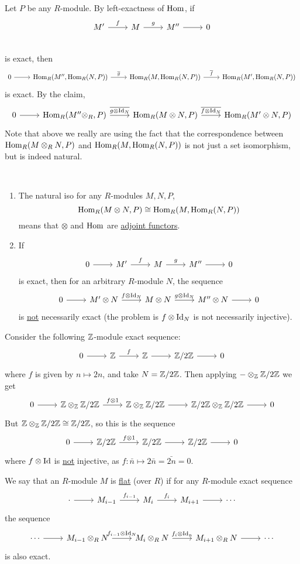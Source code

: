 \documentclass[x11names,reqno,14pt]{extarticle}
\begin{document}
Let $P$ be any $R$-module. By left-exactness of ${\mathrm{Hom}}$, if 
\[
\begin{tikzcd}
M'\ar[r, "f"] & M \ar[r, "g"] & M'' \ar[r] & 0 \\
\end{tikzcd}
\]
is exact, then 
\[
\begin{tikzcd}
0\ar[r] & \Hom_R(M'', \Hom_R(N, P)) \ar[r, "\bar{g}"] & \Hom_R(M, \Hom_R(N, P)) \ar[r, "\bar{f}"] & \Hom_R(M', \Hom_R(N, P))
\end{tikzcd}
\]
is exact. By the claim, 
\[
\begin{tikzcd}
0\ar[r]&\Hom_R(M''\otimes_R, P) \ar[r, "\bar{g\otimes\Id_N}"] & \Hom_R(M\otimes N, P) \ar[r, "\bar{f\otimes\Id_N}"] &\Hom_R(M'\otimes N, P)
\end{tikzcd}
\]
Note that above we really are using the fact that the correspondence between ${\mathrm{Hom}}_R(M\otimes_RN, P)$ and ${\mathrm{Hom}}_R(M, {\mathrm{Hom}}_R(N, P))$ is not just a set isomorphism, but is indeed natural.

\rem\,

\begin{enumerate}

\item The natural iso for any $R$-modules $M, N, P$, 
\[
{\mathrm{Hom}}_R(M\otimes N, P) \cong {\mathrm{Hom}}_R(M,{\mathrm{Hom}}_R(N, P))
\]
means that $\otimes$ and ${\mathrm{Hom}}$ are \underline{adjoint functors}.

\item If 
\[
\exactshort{M'}{f}{M}{g}{M''}
\]
is exact, then for an arbitrary $R$-module $N$, the sequence
\[
\exactshort{M'\otimes N}{f\otimes\Id_N}{M\otimes N}{g\otimes\Id_N}{M''\otimes N}
\]
is \underline{not} necessarily exact (the problem is $f\otimes\operatorname{\mathrm{Id}}_N$ is not necessarily injective).

\end{enumerate}

\exm

Consider the following $\mathbb{Z}$-module exact sequence:
\[
\exactshort{\Z}{f}{\Z}{}{\Z/2\Z}
\]
where $f$ is given by $n\mapsto 2n$, and take $N = \mathbb{Z}/2\mathbb{Z}$. Then applying $-\otimes_{\mathbb{Z}}\mathbb{Z}/2\mathbb{Z}$ we get 
\[
\exactshort{\Z\otimes_\Z\Z/2\Z}{f\otimes1}{\Z\otimes_\Z\Z/2\Z}{}{\Z/2\Z\otimes_\Z\Z/2\Z}
\]
But $\mathbb{Z}\otimes_{\mathbb{Z}}\mathbb{Z}/2\mathbb{Z}\cong\mathbb{Z}/2\mathbb{Z}$, so this is the sequence
\[
\exactshort{\Z/2\Z}{f\otimes1}{\Z/2\Z}{}{\Z/2\Z}
\]
where $f\otimes\operatorname{\mathrm{Id}}$ is \underline{not} injective, as $f: \bar{n}\mapsto 2\bar{n} = \bar{2n} = 0$. 


We say that an $R$-module $M$ is \underline{flat} (over $R$) if for any $R$-module exact sequence
\[
\begin{tikzcd}
\cdot\ar[r]&M_{i -1 }\ar[r, "f_{i - 1}"] & M_i \ar[r, "f_i"] & M_{i + 1} \ar[r] & \cdots 
\end{tikzcd}
\]
the sequence 
\[
\begin{tikzcd}
\cdots\ar[r]& M_{i - 1}\otimes_RN \ar[r, "f_{i -1 }\otimes\Id_N"] & M_i\otimes_RN \ar[r, "f_i\otimes\Id_n"] & M_{i + 1}\otimes_RN \ar[r] & \cdots 
\end{tikzcd}
\]
is also exact. 
\end{document}
